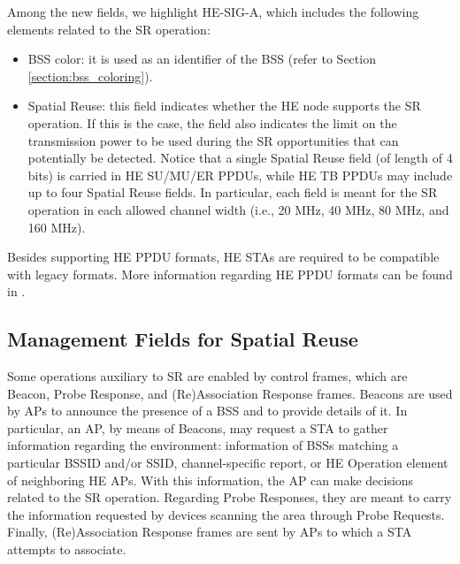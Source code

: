 \documentclass{article}
\begin{document}
\begin{appendices}
Among the new fields, we highlight HE-SIG-A, which includes the following elements related to the SR operation:
\begin{itemize}
	\item BSS color: it is used as an identifier of the BSS (refer to Section \ref{section:bss_coloring}).
	\item Spatial Reuse: this field indicates whether the HE node supports the SR operation. If this is the case, the field also indicates the limit on the transmission power to be used during the SR opportunities that can potentially be detected. Notice that a single Spatial Reuse field (of length of 4 bits) is carried in HE SU/MU/ER PPDUs,  while HE TB PPDUs may include up to four Spatial Reuse fields. In particular, each field is meant for the SR operation in each allowed channel width (i.e., 20 MHz, 40 MHz, 80 MHz, and 160 MHz).
\end{itemize}

Besides supporting HE PPDU formats, HE STAs are required to be compatible with legacy formats. More information regarding HE PPDU formats can be found in \cite{rhode2017whitepaper}. 

\subsection{Management Fields for Spatial Reuse}
Some operations auxiliary to SR are enabled by control frames, which are Beacon, Probe Response, and (Re)Association Response frames. Beacons are used by APs to announce the presence of a BSS and to provide details of it. In particular, an AP, by means of Beacons, may request a STA to gather information regarding the environment: information of BSSs matching a particular BSSID and/or SSID, channel-specific report, or HE Operation element of neighboring HE APs. With this information, the AP can make decisions related to the SR operation. Regarding Probe Responses, they are meant to carry the information requested by devices scanning the area through Probe Requests. Finally, (Re)Association Response frames are sent by APs to which a STA attempts to associate.


\end{appendices}
\end{document}
